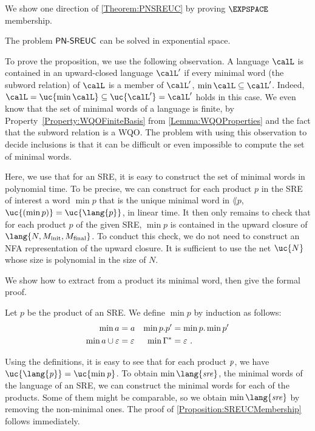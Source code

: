 \documentclass[../../diss.tex]{subfiles}
\begin{document}
We show one direction of \cref{Theorem:PNSREUC} by proving $\EXPSPACE$ membership.

\begin{proposition}%
\label{Proposition:SREUCMembership}%
    The problem $\mathsf{PN\text{-}SREUC}$ can be solved in exponential space.
\end{proposition}

To prove the proposition, we use the following observation.
A language $\calL$ is contained in an upward-closed language $\calL'$ if every minimal word (\wrt the subword relation) of $\calL$ is a member of $\calL'$, \ie $\min \calL \subseteq \calL'$.
Indeed, $\calL = \uc{\min \calL} \subseteq \uc{  \calL' } = \calL'$ holds in this case.
We even know that the set of minimal words of a language is finite, by Property~\ref{Property:WQOFiniteBasis} from \cref{Lemma:WQOProperties} and the fact that the subword relation is a WQO.\@
The problem with using this observation to decide inclusions is that it can be difficult or even impossible to compute the set of minimal words.

Here, we use that for an SRE, it is easy to construct the set of minimal words in polynomial time.
To be precise, we can construct for each product $p$ in the SRE of interest a word $\min p$ that is the unique minimal word in $\lang{p}$, \ie $\uc{(\min p)} = \uc{\lang{p}}$, in linear time.
It then only remains to check that for each product $p$ of the given SRE, $\min p$ is contained in the upward closure of $\lang{N,M_\init,M_\final}$.
To conduct this check, we do not need to construct an NFA representation of the upward closure.
It is sufficient to use the net $\uc{N}$ whose size is polynomial in the size of $N$.

We show how to extract from a product its minimal word, then give the formal proof.

\begin{definition}
   Let $p$ be the product of an SRE.\@
   We define $\min p$ by induction as follows:
    \begin{align*}
        \min a &= a
        &
        \min p.p' &= \min p . \min p'
        \\
        \min a \cup \varepsilon &= \varepsilon
        &
        \min \Gamma^* &= \varepsilon\ .
    \end{align*}
\end{definition}

Using the definitions, it is easy to see that for each product $\mathit{p}$, we have $\uc{\lang{\product}} = \uc{\min \product}$.
To obtain $\min{\lang{\sre}}$, the minimal words of the language of an SRE, we can construct the minimal words for each of the products.
Some of them might be comparable, so we obtain $\min{\lang{\sre}}$ by removing the non-minimal ones.
The proof of \cref{Proposition:SREUCMembership} follows immediately.
\end{document}
